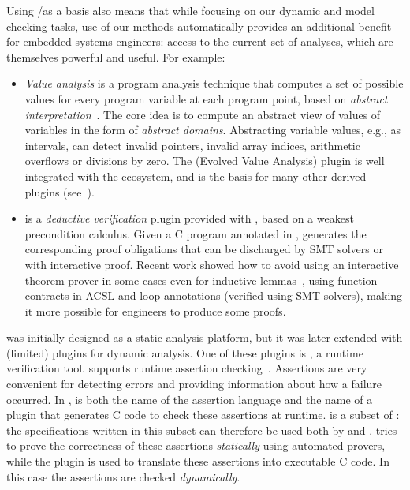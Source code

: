 Using \acsl/\framac as a basis also means that while focusing on our dynamic and model checking tasks, use of our methods automatically provides an additional benefit for embedded systems engineers: access to the current set of \framac analyses, which are themselves powerful and useful.  For example:

\begin{itemize}
\item \emph{Value analysis} is a program analysis technique that computes a set of possible values for every program variable at each program point, based on \emph{abstract interpretation}~\cite{cousot77}.
The core idea is to compute an abstract view of values of variables in the form of \emph{abstract domains}.
Abstracting variable values, e.g., as intervals, can detect invalid pointers, invalid array indices, arithmetic overflows or divisions by zero.
The \Eva (Evolved Value Analysis) plugin is well integrated with the \framac ecosystem, 
and is the basis for many other derived plugins (see~\cite{KKP2015:FAC}).

\item \Wp is a \emph{deductive verification} plugin provided with \framac, based on a weakest precondition calculus.
Given a C program annotated in \acsl, \Wp generates the corresponding proof obligations that can be discharged by SMT solvers or with interactive proof.
Recent work  showed how to avoid using an interactive theorem prover in some cases even for inductive lemmas~\cite{BLK2019:NFM}, using 
function contracts in ACSL and loop annotations (verified using SMT solvers), making it more possible for engineers to produce some proofs.
\end{itemize}

\framac was initially designed as a static analysis platform, but it was later extended with (limited) plugins for dynamic analysis.
One of these plugins is \eacsl, a runtime verification tool.
\eacsl supports runtime assertion checking~\cite{CR2006:SEN}.
Assertions are very convenient for detecting errors and providing information about how a failure occurred.
In \framac, \eacsl is both the name of the assertion language and the name of a plugin that generates C code to check these assertions at runtime.
\eacsl is a subset of \acsl: the specifications written in this subset can therefore be used both by \Wp and \eacsl.
\Wp tries to prove the correctness of these assertions {\em statically} using automated provers, while the plugin \eacsl is used to translate these assertions into executable C code.
In this case the assertions are checked {\em dynamically}.

